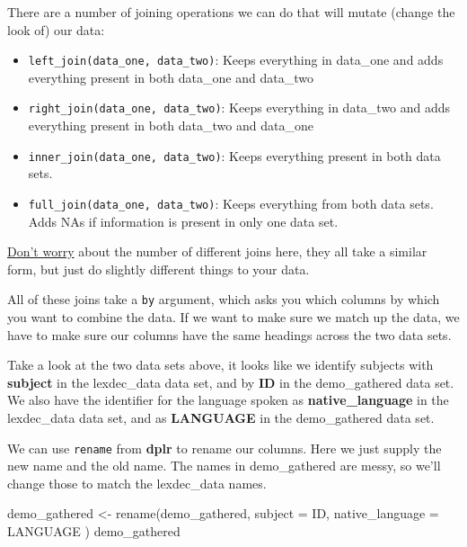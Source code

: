\documentclass[
]{book}
\newenvironment{Shaded}{\begin{snugshade}}{\end{snugshade}}
\newcommand{\AttributeTok}[1]{\textcolor[rgb]{0.77,0.63,0.00}{#1}}
\newcommand{\FunctionTok}[1]{\textcolor[rgb]{0.00,0.00,0.00}{#1}}
\newcommand{\NormalTok}[1]{#1}
\newcommand{\OtherTok}[1]{\textcolor[rgb]{0.56,0.35,0.01}{#1}}
\providecommand{\tightlist}{%
  \setlength{\itemsep}{0pt}\setlength{\parskip}{0pt}}
\begin{document}
There are a number of joining operations we can do that will mutate (change the look of) our data:

\begin{itemize}
\tightlist
\item
  \texttt{left\_join(data\_one,\ data\_two)}: Keeps everything in data\_one and adds everything present in both data\_one and data\_two
\item
  \texttt{right\_join(data\_one,\ data\_two)}: Keeps everything in data\_two and adds everything present in both data\_two and data\_one
\item
  \texttt{inner\_join(data\_one,\ data\_two)}: Keeps everything present in both data sets.
\item
  \texttt{full\_join(data\_one,\ data\_two)}: Keeps everything from both data sets. Adds NAs if information is present in only one data set.
\end{itemize}

\href{https://youtu.be/81uIhRa5kvg}{Don't worry} about the number of different joins here, they all take a similar form, but just do slightly different things to your data.

All of these joins take a \texttt{by} argument, which asks you which columns by which you want to combine the data. If we want to make sure we match up the data, we have to make sure our columns have the same headings across the two data sets.

Take a look at the two data sets above, it looks like we identify subjects with \textbf{subject} in the lexdec\_data data set, and by \textbf{ID} in the demo\_gathered data set. We also have the identifier for the language spoken as \textbf{native\_language} in the lexdec\_data data set, and as \textbf{LANGUAGE} in the demo\_gathered data set.

We can use \texttt{rename} from \textbf{dplr} to rename our columns. Here we just supply the new name and the old name. The names in demo\_gathered are messy, so we'll change those to match the lexdec\_data names.

\begin{Shaded}
\begin{Highlighting}[]
\NormalTok{demo\_gathered }\OtherTok{\textless{}{-}} \FunctionTok{rename}\NormalTok{(demo\_gathered, }
                        \AttributeTok{subject =}\NormalTok{ ID, }
                        \AttributeTok{native\_language =}\NormalTok{ LANGUAGE}
\NormalTok{                        )}
\NormalTok{demo\_gathered}
\end{Highlighting}
\end{Shaded}
\end{document}
